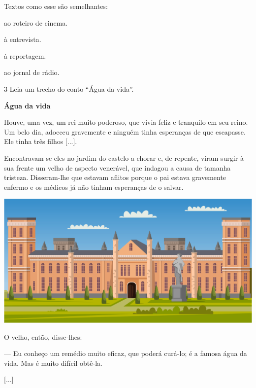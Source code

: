 Textos como esse são semelhantes:

\begin{escolha}[itemsep=-5pt]
\item ao roteiro de cinema.

\item à entrevista.

\item à reportagem.

\item ao jornal de rádio.
\end{escolha}

\num{3} Leia um trecho do conto ``Água da vida''.

\begin{myquote}
\textbf{Água da vida}

Houve, uma vez, um rei muito poderoso, que vivia feliz e tranquilo em
seu reino. Um belo dia, adoeceu gravemente e ninguém tinha esperanças de
que escapasse. Ele tinha três filhos {[}...{]}.

Encontravam-se eles no jardim do castelo a chorar e, de repente, viram
surgir à sua frente um velho de aspecto venerável, que indagou a causa
de tamanha tristeza. Disseram-lhe que estavam aflitos porque o pai
estava gravemente enfermo e os médicos já não tinham esperanças de o
salvar.

\begin{center}
\noindent\includegraphics[width=\textwidth]{./media/image3d.jpeg}
\end{center}

O velho, então, disse-lhes:

--- Eu conheço um remédio muito eficaz, que poderá curá-lo; é a famosa
água da vida. Mas é muito difícil obtê-la.

{[}...{]}

\end{myquote}

